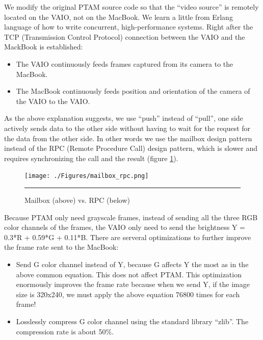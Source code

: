We modify the original PTAM source code so that the ``video source'' is remotely located on the VAIO, not on the MacBook. We learn a little from Erlang language \citep{Reference17} of how to write concurrent, high-performance systems. Right after the TCP (Transmission Control Protocol) connection between the VAIO and the MackBook is established:

\begin{itemize}
	\item The VAIO continuously feeds frames captured from its camera to the MacBook.
	\item The MacBook continuously feeds position and orientation of the camera of the VAIO to the VAIO.
\end{itemize}

As the above explanation suggests, we use ``push'' instead of ``pull'', one side actively sends data to the other side without having to wait for the request for the data from the other side. In other words we use the mailbox design pattern instead of the RPC (Remote Procedure Call) design pattern, which is slower and requires synchronizing the call and the result (figure \ref{fig:MailboxRPC}).

\begin{figure}[htbp]
	\centering
	\texttt{[image: ./Figures/mailbox\_rpc.png]}
	\rule{35em}{0.5pt}
	\caption[Mailbox vs. RPC]{Mailbox (above) vs. RPC (below)}
	\label{fig:MailboxRPC}
\end{figure}

Because PTAM only need grayscale frames, instead of sending all the three RGB color channels of the frames, the VAIO only need to send the brightness Y = 0.3*R + 0.59*G + 0.11*B. There are serveral optimizations to further improve the frame rate sent to the MacBook:

\begin{itemize}
	\item Send G color channel instead of Y, because G affects Y the most as in the above common equation. This does not affect PTAM. This optimization enormously improves the frame rate because when we send Y, if the image size is 320x240, we must apply the above equation 76800 times for each frame!
	\item Losslessly compress G color channel using the standard library ``zlib''. The compression rate is about 50\%.
\end{itemize}

